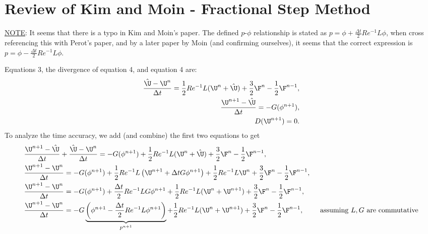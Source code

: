 \documentclass[landscape]{article}
\newcommand{\ReInv}{Re^{-1}}
\begin{document}
\newpage
\section{Review of Kim and Moin - Fractional Step Method}
\underline{NOTE}: It seems that there is a typo in Kim and Moin's paper. The defined $p$-$\phi$ relationship is stated as $p = \phi + \frac{\Delta t}{2} \ReInv L \phi$, when cross referencing this with Perot's paper, and by a later paper by Moin (and confirming ourselves), it seems that the correct expression is $p = \phi - \frac{\Delta t}{2} \ReInv L \phi$.

Equations 3, the divergence of equation 4, and equation 4 are:
\begin{equation}\begin{aligned} \label{eq:TD_FSM_KM}
\frac{\hat{\U}-\U^n}{\Delta t} = \frac{1}{2} \ReInv L(\U^n+\hat{\U}) + \frac{3}{2}\F^n - \frac{1}{2}\F^{n-1}, \\
\frac{\U^{n+1}-\hat{\U}}{\Delta t} =  - G (\phi^{n+1}), \\
D(\U^{n+1}) = 0.
\end{aligned} \end{equation}
To analyze the time accuracy, we add (and combine) the first two equations to get
\begin{equation}\begin{aligned}
& \frac{\U^{n+1}-\hat{\U}}{\Delta t} + \frac{\hat{\U}-\U^n}{\Delta t} = - G (\phi^{n+1}) + \frac{1}{2} \ReInv L(\U^n+\hat{\U}) + \frac{3}{2}\F^n - \frac{1}{2}\F^{n-1}, \\
& \frac{\U^{n+1}-\U^n}{\Delta t} = - G (\phi^{n+1}) + \frac{1}{2} \ReInv L\left(\U^{n+1}+ \Delta t G\phi^{n+1} \right) + \frac{1}{2} \ReInv L\U^n + \frac{3}{2}\F^n - \frac{1}{2}\F^{n-1}, \\
& \frac{\U^{n+1}-\U^n}{\Delta t} = - G (\phi^{n+1}) + \frac{\Delta t}{2} \ReInv L G\phi^{n+1} + \frac{1}{2} \ReInv L(\U^n+\U^{n+1}) + \frac{3}{2}\F^n - \frac{1}{2}\F^{n-1}, \\
& \frac{\U^{n+1}-\U^n}{\Delta t} = - G \underbrace{\left(\phi^{n+1} - \frac{\Delta t}{2} \ReInv L \phi^{n+1} \right)}_{p^{n+1}} + \frac{1}{2} \ReInv L(\U^n+\U^{n+1}) + \frac{3}{2}\F^n - \frac{1}{2}\F^{n-1}, \qquad \text{ assuming $L,G$ are commutative} \\
\end{aligned} \end{equation}
\end{document}
